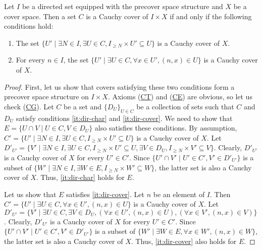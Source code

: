 \documentclass[reqno]{amsart}
\newcommand{\axref}[1]{(\hyperref[ax:#1]{#1})}
\theoremstyle{definition}
\theoremstyle{remark}
\numberwithin{figure}{section}
\begin{document}
\begin{lem}
Let $I$ be a directed set equipped with the precover space structure and $X$ be a cover space.
Then a set $C$ is a Cauchy cover of $I \times X$ if and only if the following conditions hold:
\begin{enumerate}
\item \label{it:dir-char} The set $\{ U' \mid \exists N \in I, \exists U \in C, I_{\geq N} \times U' \subseteq U \}$ is a Cauchy cover of $X$.
\item \label{it:dir-cover} For every $n \in I$, the set $\{ U' \mid \exists U \in C, \forall x \in U', (n,x) \in U \}$ is a Cauchy cover of $X$.
\end{enumerate}
\end{lem}
\begin{proof}
First, let us show that covers satisfying these two conditions form a precover space structure on $I \times X$.
Axioms \axref{CT} and \axref{CE} are obvious, so let us check \axref{CG}.
Let $C$ be a set and $\{ D_U \}_{U \in C}$ be a collection of sets such that $C$ and $D_U$ satisfy conditions \eqref{it:dir-char} and \eqref{it:dir-cover}.
We need to show that $E = \{ U \cap V \mid U \in C, V \in D_U \}$ also satisfies these conditions.
By assumption, $C' = \{ U' \mid \exists N \in I, \exists U \in C, I_{\geq N} \times U' \subseteq U \}$ is a Cauchy cover of $X$.
Let $D'_{U'} = \{ V' \mid \exists N \in I, \exists U \in C, I_{\geq N} \times U' \subseteq U, \exists V \in D_U, I_{\geq N} \times V' \subseteq V \}$.
Clearly, $D'_{U'}$ is a Cauchy cover of $X$ for every $U' \in C'$.
Since $\{ U' \cap V' \mid U' \in C', V' \in D'_{U'} \}$ is a subset of $\{ W' \mid \exists N \in I, \exists W \in E, I_{\geq N} \times W' \subseteq W \}$, the latter set is also a Cauchy cover of $X$.
Thus, \eqref{it:dir-char} holds for $E$.

Let us show that $E$ satisfies \eqref{it:dir-cover}.
Let $n$ be an element of $I$.
Then $C' = \{ U' \mid \exists U \in C, \forall x \in U', (n,x) \in U \}$ is a Cauchy cover of $X$.
Let $D'_{U'} = \{ V' \mid \exists U \in C, \exists V \in D_U, (\forall x \in U', (n,x) \in U), (\forall x \in V', (n,x) \in V)\}$.
Clearly, $D'_{U'}$ is a Cauchy cover of $X$ for every $U' \in C'$.
Since $\{ U' \cap V' \mid U' \in C', V' \in D'_{U'} \}$ is a subset of $\{ W' \mid \exists W \in E, \forall x \in W', (n,x) \in W \}$, the latter set is also a Cauchy cover of $X$.
Thus, \eqref{it:dir-cover} also holds for $E$.


\end{proof}
\end{document}
